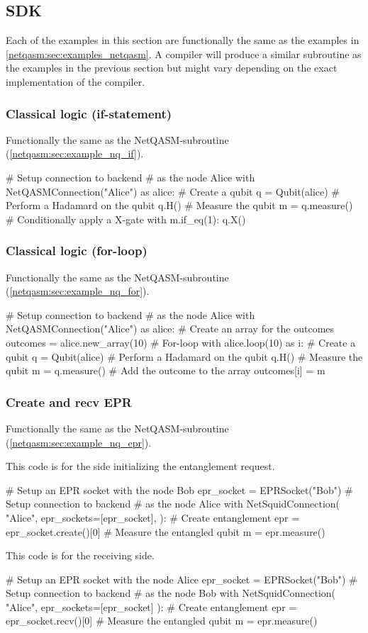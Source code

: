 \subsection{SDK}
\label{app:examples_sdk}
Each of the examples in this section are functionally the same as the examples in \cref{netqasm:sec:examples_netqasm}.
A compiler will produce a similar subroutine as the examples in the previous section but might vary depending on the exact implementation of the compiler.


\subsubsection{Classical logic (if-statement)}
Functionally the same as the \ac{NetQASM}-subroutine (\cref{netqasm:sec:example_nq_if}).
\begin{pycode}
# Setup connection to backend
# as the node Alice
with NetQASMConnection("Alice") as alice:
  # Create a qubit
  q = Qubit(alice)
  # Perform a Hadamard on the qubit
  q.H()
  # Measure the qubit
  m = q.measure()
  # Conditionally apply a X-gate
  with m.if_eq(1):
    q.X()
\end{pycode}

\subsubsection{Classical logic (for-loop)}
Functionally the same as the \ac{NetQASM}-subroutine (\cref{netqasm:sec:example_nq_for}).
\begin{pycode}
# Setup connection to backend
# as the node Alice
with NetQASMConnection("Alice") as alice:
  # Create an array for the outcomes
  outcomes = alice.new_array(10)
  # For-loop
  with alice.loop(10) as i:
    # Create a qubit
    q = Qubit(alice)
    # Perform a Hadamard on the qubit
    q.H()
    # Measure the qubit
    m = q.measure()
    # Add the outcome to the array
    outcomes[i] = m
\end{pycode}

\subsubsection{Create and recv EPR}
Functionally the same as the \ac{NetQASM}-subroutine (\cref{netqasm:sec:example_nq_epr}).

This code is for the side initializing the entanglement request.
\begin{pycode}
# Setup an EPR socket with the node Bob
epr_socket = EPRSocket("Bob")
# Setup connection to backend
# as the node Alice
with NetSquidConnection(
"Alice",
epr_sockets=[epr_socket],
):
  # Create entanglement
  epr = epr_socket.create()[0]
  # Measure the entangled qubit
  m = epr.measure()
\end{pycode}

This code is for the receiving side.
\begin{pycode}
# Setup an EPR socket with the node Alice
epr_socket = EPRSocket("Bob")
# Setup connection to backend
# as the node Bob
with NetSquidConnection(
"Alice",
epr_sockets=[epr_socket]
):
  # Create entanglement
  epr = epr_socket.recv()[0]
  # Measure the entangled qubit
  m = epr.measure()
\end{pycode}
